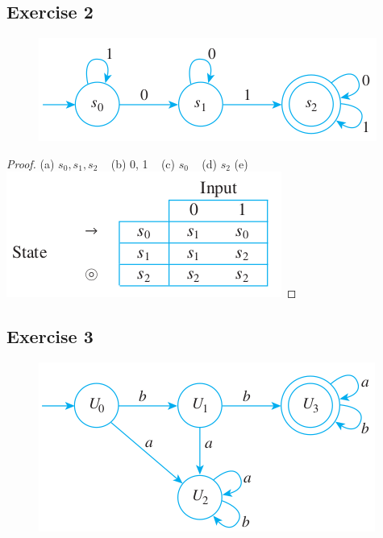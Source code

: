 \documentclass[14pt]{extarticle}
\begin{document}
\subsection{Exercise 2}
\begin{figure}[ht!]
    \centering
    \includegraphics[scale=0.5]{../images/12.2.2.png}
\end{figure}

\begin{proof}
    (a) \(s_0, s_1, s_2\) \,\,\, (b) 0, 1 \,\,\, (c) \(s_0\) \,\,\, (d) \(s_2\)
    (e) \includegraphics[scale=0.5]{../images/12.2.2.e.png}
\end{proof}

\subsection{Exercise 3}
\begin{figure}[ht!]
    \centering
    \includegraphics[scale=0.5]{../images/12.2.3.png}
\end{figure}
\end{document}

